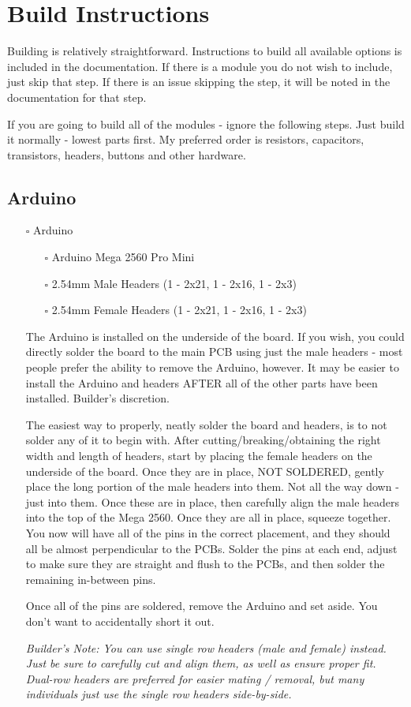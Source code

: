 \documentclass[11pt]{article}
\begin{document}
\newpage
\section{Build Instructions}
\label{sec:orga5a57bb}
Building is relatively straightforward.  Instructions to build all available options is included in the documentation.  If there is a module you do not wish to include, just skip that step.  If there is an issue skipping the step, it will be noted in the documentation for that step.

If you are going to build all of the modules - ignore the following steps.  Just build it normally - lowest parts first.  My preferred order is resistors, capacitors, transistors, headers, buttons and other hardware.

\subsection{Arduino}
\label{sec:org0aacc34}
\begin{itemize}
\item[{$\square$}] Arduino
\begin{itemize}
\item[{$\square$}] Arduino Mega 2560 Pro Mini
\item[{$\square$}] 2.54mm Male Headers (1 - 2x21, 1 - 2x16, 1 - 2x3)
\item[{$\square$}] 2.54mm Female Headers (1 - 2x21, 1 - 2x16, 1 - 2x3)
\end{itemize}

The Arduino is installed on the underside of the board.  If you wish, you could directly solder the board to the main PCB using just the male headers - most people prefer the ability to remove the Arduino, however.  It may be easier to install the Arduino and headers AFTER all of the other parts have been installed.  Builder's discretion.

The easiest way to properly, neatly solder the board and headers, is to not solder any of it to begin with.  After cutting/breaking/obtaining the right width and length of headers, start by placing the female headers on the underside of the board.  Once they are in place, NOT SOLDERED, gently place the long portion of the male headers into them.  Not all the way down - just into them.  Once these are in place, then carefully align the male headers into the top of the Mega 2560.  Once they are all in place, squeeze together.  You now will have all of the pins in the correct placement, and they should all be almost perpendicular to the PCBs.  Solder the pins at each end, adjust to make sure they are straight and flush to the PCBs, and then solder the remaining in-between pins.

Once all of the pins are soldered, remove the Arduino and set aside.  You don't want to accidentally short it out.  

\emph{Builder's Note:  You can use single row headers (male and female) instead.  Just be sure to carefully cut and align them, as well as ensure proper fit.  Dual-row headers are preferred for easier mating / removal, but many individuals just use the single row headers side-by-side.}
\end{itemize}
\end{document}
